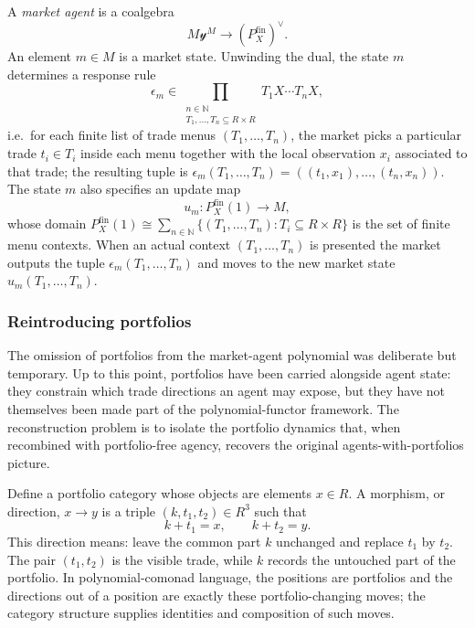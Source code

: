 \documentclass[11pt, one side, article]{memoir}
\theoremstyle{definition}
\theoremstyle{plain}
\newenvironment{definition}
  {\pushQED{\qed}\renewcommand{\qedsymbol}{$\lozenge$}\definitionx}
  {\popQED\enddefinitionx}
\newcommand{\nn}{\mathbb{N}}
\newcommand{\yon}{{\mathcal{y}}}
\newcommand{\0}{\textsf{0}}
\newcommand{\1}{\tn{\textsf{1}}}
\begin{document}
\begin{definition}[Market agent]\label{def:market-agent}
A \emph{market agent} is a coalgebra
\[
M\yon^M\to (P_X^{\mathrm{fin}})^\vee.
\]
An element $m\in M$ is a market state.  Unwinding the dual, the state $m$ determines a response rule
\[
\epsilon_m\in
\prod_{\substack{n\in\nn\\ T_1,\ldots,T_n\subseteq R\times R}}
T_1X\cdots T_nX,
\]
i.e.\ for each finite list of trade menus $(T_1,\ldots,T_n)$, the market picks a particular trade $t_i\in T_i$ inside each menu together with the local observation $x_i$ associated to that trade; the resulting tuple is $\epsilon_m(T_1,\ldots,T_n)=((t_1,x_1),\ldots,(t_n,x_n))$.  The state $m$ also specifies an update map
\[
u_m\colon P_X^{\mathrm{fin}}(1)\to M,
\]
whose domain $P_X^{\mathrm{fin}}(1)\cong\sum_{n\in\nn}\{(T_1,\ldots,T_n):T_i\subseteq R\times R\}$ is the set of finite menu contexts.  When an actual context $(T_1,\ldots,T_n)$ is presented the market outputs the tuple $\epsilon_m(T_1,\ldots,T_n)$ and moves to the new market state $u_m(T_1,\ldots,T_n)$.
\end{definition}

\subsubsection*{Reintroducing portfolios}

The omission of portfolios from the market-agent polynomial was deliberate but temporary.  Up to this point, portfolios have been carried alongside agent state: they constrain which trade directions an agent may expose, but they have not themselves been made part of the polynomial-functor framework.  The reconstruction problem is to isolate the portfolio dynamics that, when recombined with portfolio-free agency, recovers the original agents-with-portfolios picture.

Define a portfolio category whose objects are elements $x\in R$.  A morphism, or direction, $x\to y$ is a triple $(k,t_1,t_2)\in R^3$ such that
\[
k+t_1=x,\qquad k+t_2=y.
\]
This direction means: leave the common part $k$ unchanged and replace $t_1$ by $t_2$.  The pair $(t_1,t_2)$ is the visible trade, while $k$ records the untouched part of the portfolio.  In polynomial-comonad language, the positions are portfolios and the directions out of a position are exactly these portfolio-changing moves; the category structure supplies identities and composition of such moves.
\end{document}
